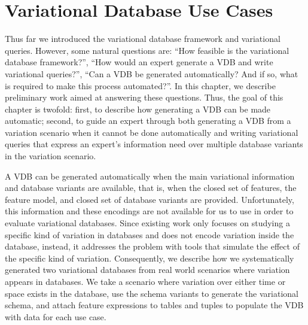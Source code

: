 \chapter{Variational Database Use Cases}
\label{ch:vdbusecase}


Thus far we introduced the variational database framework and variational
queries. However, some natural questions are: ``How feasible is the variational
database framework?'', ``How would an expert generate a VDB and write 
variational queries?'', ``Can a VDB be generated automatically? And if so,
what is required to make this process automated?''. 
%
In this chapter, we describe preliminary work aimed at answering these questions.
Thus, the goal of this chapter is twofold: 
first, to describe how generating a VDB can be made automatic;
second, to guide an expert through both generating a VDB
from a variation scenario when it cannot be done automatically and
writing variational queries that express an expert's information need over
multiple database variants in the variation scenario.
%

A VDB can be generated automatically when the main variational information and
database variants are available, that is, when the closed set of features, the
feature model, and closed set of database variants are provided.
%
Unfortunately, this information and these encodings are not available 
for us to use in order to evaluate variational databases.
Since existing work only focuses on studying a specific 
kind of variation in databases and does not encode variation inside the database,
instead, it addresses the problem with tools that simulate the effect of the
specific kind of variation.
Consequently, we describe how we systematically generated two 
variational databases from real world scenarios where variation appears
in databases. We take a scenario where variation over either time or space
exists in the database, use the schema variants to generate the variational schema, 
and attach feature expressions to tables and tuples to populate the VDB with
data for each use case. 


